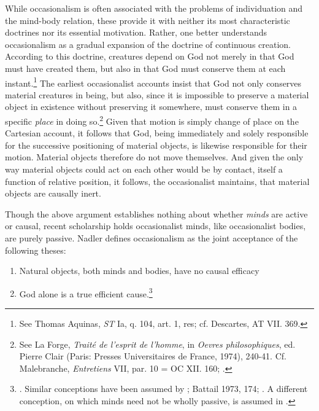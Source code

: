 \documentclass{article}
\begin{document}
While occasionalism is often associated with the problems of
individuation and the mind-body relation, these provide it with neither
its most characteristic doctrines nor its essential motivation. Rather,
one better understands occasionalism as a gradual expansion of the
doctrine of continuous creation. According to this doctrine, creatures
depend on God not merely in that God must have created them, but also in
that God must conserve them at each instant.\footnote{See Thomas
  Aquinas, \emph{ST} Ia, q. 104, art. 1, res; cf. Descartes, AT VII.
  369.} The earliest occasionalist accounts insist that God not only
conserves material creatures in being, but also, since it is impossible
to preserve a material object in existence without preserving it
somewhere, must conserve them in a specific \emph{place} in doing
so.\footnote{See La Forge, \emph{Traité de l'esprit de l'homme}, in
  \emph{Oevres philosophiques}, ed. Pierre Clair (Paris: Presses
  Universitaires de France, 1974), 240-41. Cf. Malebranche,
  \emph{Entretiens} VII, par. 10 = OC XII. 160; \autocite{Nadler1998}.} Given that
motion is simply change of place on the Cartesian account, it follows
that God, being immediately and solely responsible for the successive
positioning of material objects, is likewise responsible for their
motion. Material objects therefore do not move themselves. And given the
only way material objects could act on each other would be by contact,
itself a function of relative position, it follows, the occasionalist
maintains, that material objects are causally inert.

Though the above argument establishes nothing about whether \emph{minds}
are active or causal, recent scholarship holds occasionalist minds, like
occasionalist bodies, are purely passive. Nadler defines occasionalism
as the joint acceptance of the following theses:

\begin{enumerate}
\item
  Natural objects, both minds and bodies, have no causal efficacy
\item
  God alone is a true efficient cause.\footnote{\autocite[39]{Nadler2005}. Similar
    conceptions have been assumed by \autocite[45-46]{Pyle2003}; Battail 1973,
    174; \autocite[288]{Winkler2011}. A different conception, on which minds need
    not be wholly passive, is assumed in \autocite[358]{Radner1993}.}
\end{enumerate}
\end{document}
